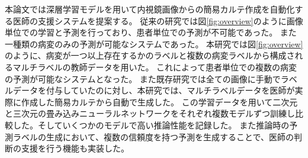 本論文では深層学習モデルを用いて内視鏡画像からの簡易カルテ作成を自動化する医師の支援システムを提案する。
従来の研究では図\ref{fig:overview}のように画像単位での学習と予測を行っており、患者単位での予測が不可能であった。
また一種類の病変のみの予測が可能なシステムであった。
本研究では図\ref{fig:overview}のように、病変が一つ以上存在するかのラベルと複数の病変ラベルから構成されるマルチラベルの教師データを用いた。
これによって患者単位での複数の病変の予測が可能なシステムとなった。
また既存研究では全ての画像に手動でラベルデータを付与していたのに対し、本研究では、マルチラベルデータを医師が実際に作成した簡易カルテから自動で生成した。
この学習データを用いて二次元と三次元の畳み込みニューラルネットワークをそれぞれ複数モデルずつ訓練し比較した。そしていくつかのモデルで高い推論性能を記録した。
また推論時の予測ラベルの生成において、複数の信頼度を持つ予測を生成することで、医師の判断の支援を行う機能も実装した。

